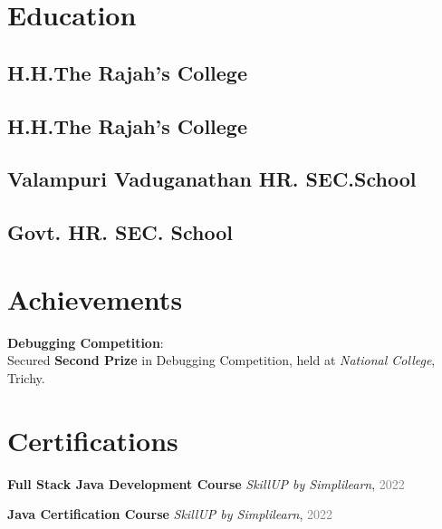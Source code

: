 \documentclass[]{azhagu-swe-resume-openfont}
\begin{document}
\begin{minipage}[t]{0.33\textwidth}

\section{Education} 

\subsection{H.H.The Rajah’s College}
\sectionsep

\subsection{H.H.The Rajah’s College}
\sectionsep

\subsection{Valampuri Vaduganathan HR. SEC.School}
\sectionsep

\subsection{Govt. HR. SEC. School}
\sectionsep


\section{Achievements}
 \textbf{Debugging Competition}: \\ Secured \textbf{Second Prize} in Debugging Competition, held at \textit{National College}, Trichy.
\sectionsep

\section{Certifications}
\vspace{\topsep}
\begin{tightemize}
    \item \textbf{ Full Stack Java Development Course} \textit{SkillUP by Simplilearn}, \textcolor{gray}{2022}
    \item \textbf{Java Certification Course} \textit{SkillUP by Simplilearn}, \textcolor{gray}{2022}
\end{tightemize}
\sectionsep




\end{minipage}
\end{document}
